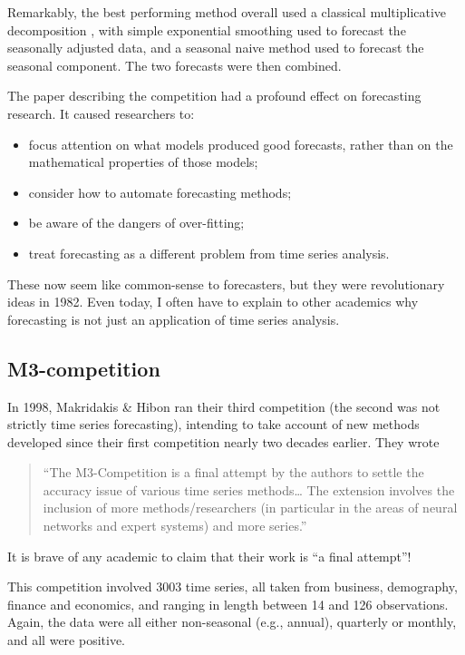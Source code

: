\documentclass[11pt,a4paper,]{article}
\providecommand{\tightlist}{%
  \setlength{\itemsep}{0pt}\setlength{\parskip}{0pt}}
\begin{document}
Remarkably, the best performing method overall used a classical multiplicative decomposition \autocite{fpp2}, with simple exponential smoothing used to forecast the seasonally adjusted data, and a seasonal naive method used to forecast the seasonal component. The two forecasts were then combined.

The paper describing the competition \autocite{M1} had a profound effect on forecasting research. It caused researchers to:

\begin{itemize}
\tightlist
\item
  focus attention on what models produced good forecasts, rather than on the mathematical properties of those models;
\item
  consider how to automate forecasting methods;
\item
  be aware of the dangers of over-fitting;
\item
  treat forecasting as a different problem from time series analysis.
\end{itemize}

These now seem like common-sense to forecasters, but they were revolutionary ideas in 1982. Even today, I often have to explain to other academics why forecasting is not just an application of time series analysis.

\hypertarget{m3-competition}{%
\subsection*{M3-competition}\label{m3-competition}}

In 1998, Makridakis \& Hibon ran their third competition (the second was not strictly time series forecasting), intending to take account of new methods developed since their first competition nearly two decades earlier. They wrote

\begin{quote}
``The M3-Competition is a final attempt by the authors to settle the accuracy issue of various time series methods\ldots{} The extension involves the inclusion of more methods/researchers (in particular in the areas of neural networks and expert systems) and more series.''
\end{quote}

It is brave of any academic to claim that their work is ``a final attempt''!

This competition involved 3003 time series, all taken from business, demography, finance and economics, and ranging in length between 14 and 126 observations. Again, the data were all either non-seasonal (e.g., annual), quarterly or monthly, and all were positive.
\end{document}

